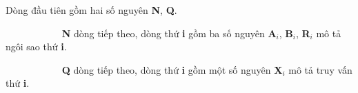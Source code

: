 Dòng đầu tiên gồm hai số nguyên \textbf{N}, \textbf{Q}.

            \textbf{N} dòng tiếp theo, dòng thứ \textbf{i} gồm ba số nguyên \textbf{A$_i$}, \textbf{B$_i$}, \textbf{R$_i$} mô tả ngôi sao thứ \textbf{i}.

            \textbf{Q} dòng tiếp theo, dòng thứ \textbf{i} gồm một số nguyên \textbf{X$_i$} mô tả truy vấn thứ \textbf{i}.